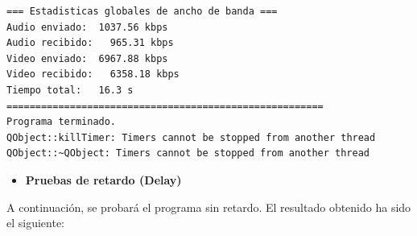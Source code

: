 \begin{adjustbox}{max width=\textwidth}
\begin{lstlisting}[language=bash,basicstyle=\ttfamily\scriptsize]
=== Estadisticas globales de ancho de banda ===
Audio enviado:	1037.56 kbps
Audio recibido:   965.31 kbps
Video enviado:	6967.88 kbps
Video recibido:   6358.18 kbps
Tiempo total: 	16.3 s
=======================================================
Programa terminado.
QObject::killTimer: Timers cannot be stopped from another thread
QObject::~QObject: Timers cannot be stopped from another thread
\end{lstlisting}
\end{adjustbox}
\vspace{\baselineskip}

\newpage

\begin{itemize}
    \item \textbf{Pruebas de retardo (Delay)}
\end{itemize}

A continuación, se probará el programa sin retardo. El resultado obtenido ha sido el siguiente:
\vspace{\baselineskip}

